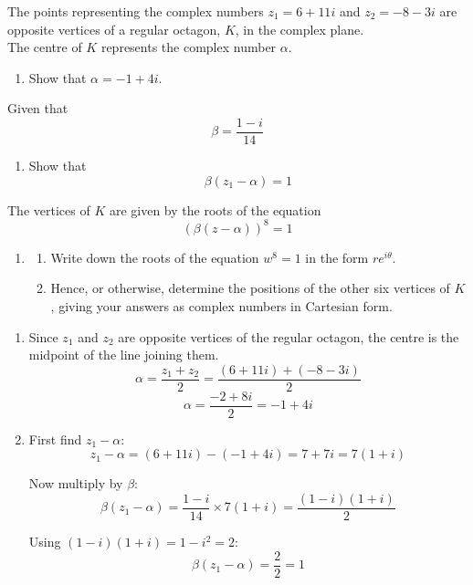 \documentclass[leqno]{article}
\begin{document}
\begin{enumerate}[
  label=\textbf{\arabic*.},
  leftmargin=*,
  topsep=0pt,
  partopsep=0pt,
  parsep=0pt
]
The points representing the complex numbers $z_1=6+11i$ and $z_2=-8-3i$ are opposite vertices of a regular octagon, $K$, in the complex plane. \\
The centre of $K$ represents the complex number $\alpha$. \\
\begin{enumerate}[label=\textbf{(\alph*)}]
  \item Show that $\alpha=-1+4i$.  \\
\end{enumerate}
Given that
\[
\beta=\frac{1-i}{14}
\]
\begin{enumerate}[label=\textbf{(\alph*)}, resume]
  \item Show that
  \[
  \beta(z_1-\alpha)=1
  \]
\end{enumerate}
The vertices of $K$ are given by the roots of the equation
\[
(\beta(z-\alpha))^8=1
\]
\begin{enumerate}[label=\textbf{(\alph*)}, resume]
  \item
  \begin{enumerate}[label=(\roman*)]
    \item Write down the roots of the equation $w^8=1$ in the form $re^{i\theta}$. 
    \item Hence, or otherwise, determine the positions of the other six vertices of $K$, giving your answers as complex numbers in Cartesian form.  \\
  \end{enumerate}
\end{enumerate}

\vspace*{10pt}

\begin{djsSolution}
\begin{enumerate}[label=\textbf{(\alph*)}]
  \item Since $z_1$ and $z_2$ are opposite vertices of the regular octagon, the centre is the midpoint of the line joining them.
\[
\alpha=\frac{z_1+z_2}{2}
=\frac{(6+11i)+(-8-3i)}{2}
\]
\[
\alpha=\frac{-2+8i}{2}=-1+4i
\]

  \item First find $z_1-\alpha$:
\[
z_1-\alpha=(6+11i)-(-1+4i)
=7+7i
=7(1+i)
\]

Now multiply by $\beta$:
\[
\beta(z_1-\alpha)=\frac{1-i}{14}\times 7(1+i)
=\frac{(1-i)(1+i)}{2}
\]

Using $(1-i)(1+i)=1-i^2=2$:
\[
\beta(z_1-\alpha)=\frac{2}{2}=1
\]


\end{enumerate}
\end{djsSolution}
\end{enumerate}
\end{document}
